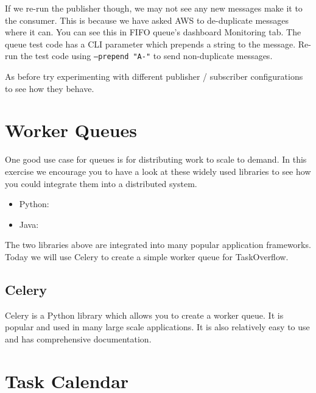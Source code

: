 \documentclass{csse4400}
\begin{document}
If we re-run the publisher though, we may not see any new messages make it to the consumer.
This is because we have asked AWS to de-duplicate messages where it can.
You can see this in FIFO queue's dashboard Monitoring tab.
The queue test code has a CLI parameter which prepends a string to the message.
Re-run the test code using \texttt{--prepend "A-"} to send non-duplicate messages.

As before try experimenting with different publisher / subscriber configurations to see how they behave.




\section{Worker Queues}

One good use case for queues is for distributing work to scale to demand.
In this exercise we encourage you to have a look at these widely used libraries
to see how you could integrate them into a distributed system.

\begin{itemize}
  \item Python: 
  \item Java: 
\end{itemize}

The two libraries above are integrated into many popular application frameworks.
Today we will use Celery to create a simple worker queue for TaskOverflow.

\subsection{Celery}

Celery is a Python library which allows you to create a worker queue.
It is popular and used in many large scale applications.
It is also relatively easy to use and has comprehensive documentation.


\section{Task Calendar}
\end{document}

